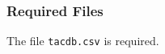 \documentclass[documentation]{subfiles}
\begin{document}

\subsubsection{Required Files}
The file {\tt tacdb.csv} is required.
\end{document}
